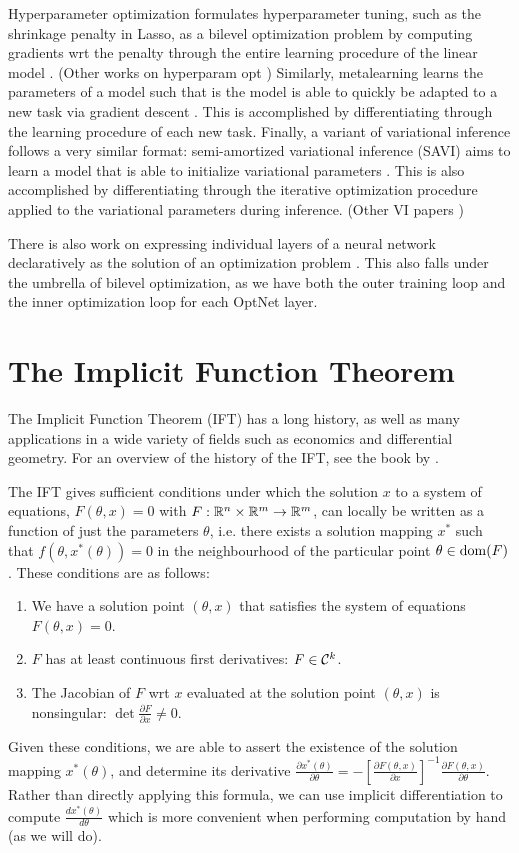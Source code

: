 \documentclass[11pt]{article}
\begin{document}
Hyperparameter optimization formulates hyperparameter tuning, such as the shrinkage penalty in Lasso,
as a bilevel optimization problem by computing gradients wrt the penalty through the entire learning procedure
of the linear model \citep{lorraine2019implasso}.
(Other works on hyperparam opt \citep{maclaurin2015reversible,bertrand2020implicit})
Similarly, metalearning learns the parameters of a model such that is the model is able to quickly
be adapted to a new task via gradient descent \citep{finn2017maml,rajeswaran2019impmaml}.
This is accomplished by differentiating through the learning procedure of each new task.
Finally, a variant of variational inference follows a very similar format:
semi-amortized variational inference (SAVI) aims to learn a model that is able to initialize
variational parameters \citep{kim2018savi}.
This is also accomplished by differentiating through the iterative optimization procedure
applied to the variational parameters during inference.
(Other VI papers \citep{vi,johnson2017pgm})

There is also work on expressing individual layers of a neural network declaratively
as the solution of an optimization problem \citep{optnet,agrawal2019diffcvx,gould2019declarative}.
This also falls under the umbrella of bilevel optimization, as we have both the outer training loop
and the inner optimization loop for each OptNet layer.

\section{The Implicit Function Theorem}
The Implicit Function Theorem (IFT) has a long history, as well as many applications
in a wide variety of fields such as economics and differential geometry.
For an overview of the history of the IFT, see the book by \citet{iftbook}.

The IFT gives sufficient conditions under which the solution $x$
to a system of equations, $F(\theta, x) = 0$ with $F: \mathbb{R}^n\times\mathbb{R}^m\to\mathbb{R}^m$,
can locally be written as a function of just the parameters $\theta$,
i.e. there exists a solution mapping $x^*$
such that $f(\theta, x^*(\theta)) = 0$ in the neighbourhood of the particular point
$\theta\in\mathrm{dom }(F)$.
These conditions are as follows:
\begin{enumerate}
\item We have a solution point $(\theta, x)$ that satisfies the system of equations
    $F(\theta, x) = 0$.
\item $F$ has at least continuous first derivatives: $F \in \mathcal{C}^k$.
\item The Jacobian of $F$ wrt $x$ evaluated at the solution point $(\theta,x)$ is nonsingular:
    $\det \frac{\partial F}{\partial x} \neq 0$.
\end{enumerate}
Given these conditions, we are able to assert the existence of the solution mapping $x^*(\theta)$,
and determine its derivative
$\frac{\partial x^*(\theta)}{\partial \theta} = -[\frac{\partial F(\theta,x)}{\partial x}]^{-1}
    \frac{\partial F(\theta,x)}{\partial \theta}$.
Rather than directly applying this formula,
we can use implicit differentiation to compute $\frac{dx^*(\theta)}{d\theta}$
which is more convenient when performing computation by hand (as we will do).
\end{document}
